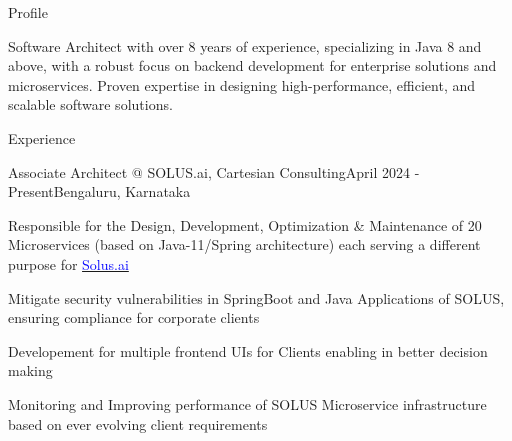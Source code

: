 \documentclass[
	a4paper, %
	12pt, %
]{resume} %
\begin{document}
\begin{rSection}{Profile}
	\item Software Architect with over 8 years of experience, specializing in Java 8 and above, with a robust focus on backend development for enterprise solutions and microservices. Proven expertise in designing high-performance, efficient, and scalable software solutions. 

\end{rSection}

\begin{rSection}{Experience}
	\hspace{-2em}
\end{rSection}

\begin{rSubsection}{Associate Architect @ SOLUS.ai, Cartesian Consulting}{April 2024 - Present}{}{Bengaluru, Karnataka}
		\setlength{\itemsep}{0.01em}
		\item{Responsible for the Design, Development, Optimization \& Maintenance of 20 Microservices (based on Java-11/Spring architecture) each serving a different purpose for \href{https://docs.solus.ai/docs/category/apis}{\textcolor{blue}{Solus.ai}}}
		\item Mitigate security vulnerabilities in SpringBoot and Java Applications of SOLUS, ensuring compliance for corporate clients		
		\item Developement for multiple frontend UIs for Clients enabling in better decision making
		\item Monitoring and Improving performance of SOLUS Microservice infrastructure based on ever evolving client requirements
	\end{rSubsection}
\end{document}
